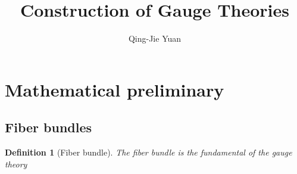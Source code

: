 \documentclass[a4paper,11pt]{article}
\title{Construction of Gauge Theories}
\author{Qing-Jie Yuan}
\date{ }
\begin{document}
\newtheorem{theorem}{Theorem}[section]
\newtheorem{definition}[theorem]{Definition}

\maketitle
\tableofcontents

\section{Mathematical preliminary}
\subsection{Fiber bundles}
\begin{definition}[Fiber bundle]
    The fiber bundle is the fundamental of the gauge theory
\end{definition}
\end{document}
